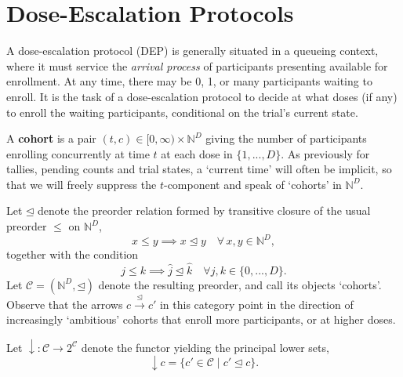 \documentclass{article}
\newcommand{\N}{\mathbb{N}}
\begin{document}
\section{Dose-Escalation Protocols}

A dose-escalation protocol (DEP) is generally situated in a queueing context, where it must service the {\em arrival process} of participants presenting available for enrollment.  At any time, there may be 0, 1, or many participants waiting to enroll.  It is the task of a dose-escalation protocol to decide at what doses (if any) to enroll the waiting participants, conditional on the trial's current state.

\begin{defn}
  A \textbf{cohort} is a pair $(t,c) \in [0,\infty) \times \N^D$ giving the number of participants enrolling concurrently at time $t$ at each dose in $\{1,...,D\}$.  As previously for tallies, pending counts and trial states, a `current time' will often be implicit, so that we will freely suppress the $t$-component and speak of `cohorts' in $\N^D$.
\end{defn}

\begin{defn}\label{cohcat}
  Let $\unlhd$ denote the preorder relation formed by transitive closure of the usual preorder $\le$ on $\N^D$,
  $$
  x \le y \implies x \unlhd y \quad\forall\, x, y \in \N^D,
  $$
  together with the condition
  $$
  j \le k \implies \widehat{j} \unlhd \widehat{k} \quad\forall j,k \in \{0,...,D\}.
  $$
  Let $\mathcal{C} = (\N^D,\unlhd)$ denote the resulting preorder, and call its objects `cohorts'.  Observe that the arrows $c \xrightarrow{\unlhd} c'$ in this category point in the direction of increasingly `ambitious' cohorts that enroll more participants, or at higher doses.
\end{defn}

\begin{nota}
  Let $\downarrow : \mathcal{C} \rightarrow 2^\mathcal{C}$ denote the functor yielding the principal lower sets,
  $$
  \downarrow c = \{ c' \in \mathcal{C} \mid c' \unlhd c \}.
  $$
\end{nota}
\end{document}
